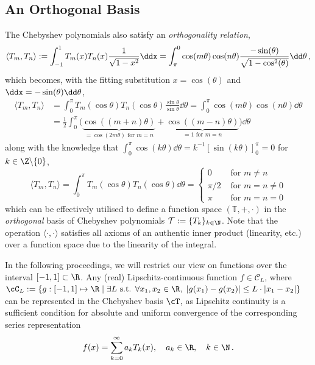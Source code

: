 \documentclass[12pt, a4paper]{article}
\begin{document}
  \subsection{An Orthogonal Basis}
  The Chebyshev polynomials also satisfy an \emph{orthogonality relation},
  $$\langle T_m, T_n \rangle := \int_{-1}^1 T_m(x) T_n(x) \frac{1}{\sqrt{1-x^2}} \ddx = \int_{\pi}^{0} \cos(m \theta) \cos(n \theta) \frac{-\sin(\theta)}{\sqrt{1-\cos^2(\theta)}} \dd\theta \,,$$
  which becomes, with the fitting substitution $x = \cos(\theta)$ and $\ddx = -\sin(\theta) \dd\theta$,
  \begin{align*}
    \langle T_m, T_n \rangle & = \int_0^\pi T_m(\cos \theta) T_n(\cos \theta) \frac{\sin \theta}{\sin \theta}\dd\theta = \int_0^\pi \cos(m \theta) \cos(n \theta) \dd\theta                            \\
                             & = \frac{1}{2} \int_0^\pi \big(\underbrace{\cos((m+n) \theta)}_{=\cos(2m\theta) \text{ for } m=n} + \underbrace{\cos((m-n) \theta)}_{=1 \text{ for } m=n}\big) \dd\theta
  \end{align*}
  along with the knowledge that $\int_0^\pi \cos(k \theta) \dd\theta = k^{-1} \left[\sin(k\theta)\right]_0^\pi = 0$ for $k \in \Z \backslash \{0\}$,
  $$\langle T_m, T_n \rangle = \int_0^\pi T_m(\cos \theta) T_n(\cos \theta) \dd\theta = \begin{cases}
      0     & \text{ for } m \neq n     \\
      \pi/2 & \text{ for } m = n \neq 0 \\
      \pi   & \text{ for } m = n = 0
    \end{cases}$$
  which can be effectively utilised to define a function space $(\mathbb{T}, +, \cdot)$ in the \emph{orthogonal} basis of Chebyshev polynomials $\mathcal{T} := \{T_k\}_{k \in \N}$.
  Note that the operation $\langle \cdot, \cdot \rangle$ satisfies all axioms of an authentic inner product (linearity, etc.) over a function space due to the linearity of the integral.

  In the following proceedings, we will restrict our view on functions over the interval $[-1, 1] \subset \R$.
  Any (real) Lipschitz-continuous function $f \in \mathcal{C}_L$, where $\cC_L := \{g: [-1, 1] \mapsto \R \;|\; \exists L \text{ s.t. } \forall x_1, x_2 \in \R, \; |g(x_1) - g(x_2)| \le L \cdot |x_1-x_2|\}$ can be represented in the Chebyshev basis $\cT$, as Lipschitz continuity is a sufficient condition for absolute and uniform convergence of the corresponding series representation
  $$f(x) = \sum_{k=0}^\infty a_k T_k(x), \quad a_k \in \R,\quad k \in \N \,.$$
\end{document}
